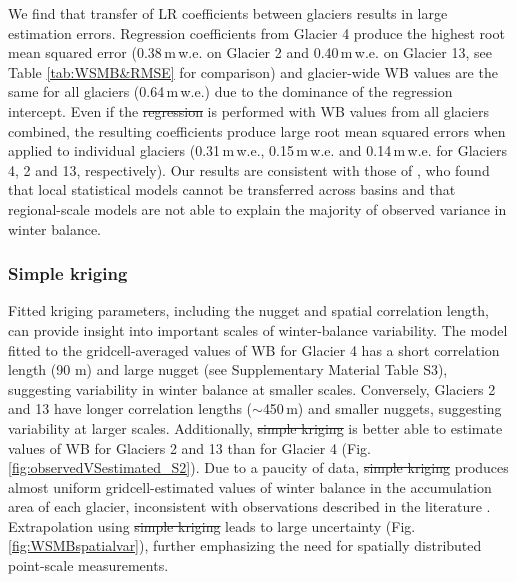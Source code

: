 \documentclass[review,oneside, letterpaper]{igs} %
\providecommand{\DIFadd}[1]{{\protect\color{blue}\uwave{#1}}} %
\providecommand{\DIFdel}[1]{{\protect\color{red}\sout{#1}}}                      %
\providecommand{\DIFaddbegin}{} %
\providecommand{\DIFaddend}{} %
\providecommand{\DIFdelbegin}{} %
\providecommand{\DIFdelend}{} %
\newcommand{\DIFscaledelfig}{0.5}
\newlength{\DIFdelgraphicswidth} %
\newlength{\DIFdelgraphicsheight} %
\newcommand{\DIFaddincludegraphics}[2][]{{\color{blue}\fbox{\DIFOincludegraphics[#1]{#2}}}} %
\newcommand{\DIFdelincludegraphics}[2][]{%
\sbox{\DIFdelgraphicsbox}{\DIFOincludegraphics[#1]{#2}}%
\settoboxwidth{\DIFdelgraphicswidth}{\DIFdelgraphicsbox} %
\settoboxtotalheight{\DIFdelgraphicsheight}{\DIFdelgraphicsbox} %
\scalebox{\DIFscaledelfig}{%
\parbox[b]{\DIFdelgraphicswidth}{\usebox{\DIFdelgraphicsbox}\\[-\baselineskip] \rule{\DIFdelgraphicswidth}{0em}}\llap{\resizebox{\DIFdelgraphicswidth}{\DIFdelgraphicsheight}{%
\setlength{\unitlength}{\DIFdelgraphicswidth}%
\begin{picture}(1,1)%
\thicklines\linethickness{2pt} %
{\color[rgb]{1,0,0}\put(0,0){\framebox(1,1){}}}%
{\color[rgb]{1,0,0}\put(0,0){\line( 1,1){1}}}%
{\color[rgb]{1,0,0}\put(0,1){\line(1,-1){1}}}%
\end{picture}%
}\hspace*{3pt}}} %
} %
\DeclareRobustCommand{\DIFaddbegin}{\DIFOaddbegin \let\includegraphics\DIFaddincludegraphics} %
\DeclareRobustCommand{\DIFaddend}{\DIFOaddend \let\includegraphics\DIFOincludegraphics} %
\DeclareRobustCommand{\DIFdelbegin}{\DIFOdelbegin \let\includegraphics\DIFdelincludegraphics} %
\DeclareRobustCommand{\DIFdelend}{\DIFOaddend \let\includegraphics\DIFOincludegraphics} %
\begin{document}
We find that transfer of LR coefficients between glaciers results in large estimation errors. Regression coefficients from Glacier 4 produce the highest root mean squared error (0.38\,m\,w.e. on Glacier 2 and 0.40\,m\,w.e. on Glacier 13, see Table \ref{tab:WSMB&RMSE} for comparison) and glacier-wide WB values are the same for all glaciers (0.64\,m\,w.e.) due to the dominance of the regression intercept. Even if the \DIFdelbegin \DIFdel{regression }\DIFdelend \DIFaddbegin \DIFadd{LR }\DIFaddend is performed with WB values from all glaciers combined, the resulting coefficients produce large root mean squared errors when applied to  individual glaciers (0.31\,m\,w.e., 0.15\,m\,w.e. and 0.14\,m\,w.e. for Glaciers 4, 2 and 13, respectively). Our results are consistent with those of \cite{Grunewald2013}, who found that local statistical models cannot be transferred across basins and that regional-scale models are not able to explain the majority of observed variance in winter balance. 

\subsubsection{Simple kriging}

Fitted kriging parameters, including the nugget and spatial correlation length, can provide insight into important scales of winter-balance variability. The model fitted to the gridcell-averaged values of WB for Glacier 4 has a short correlation length (90 m) and large nugget (see Supplementary Material Table S3), suggesting variability in winter balance at smaller scales. Conversely, Glaciers 2 and 13 have longer correlation lengths ($\sim$450\,m) and smaller nuggets, suggesting variability at larger scales. 
Additionally, \DIFdelbegin \DIFdel{simple kriging }\DIFdelend \DIFaddbegin \DIFadd{SK }\DIFaddend is better able to estimate values of WB for Glaciers 2 and 13 than for Glacier 4 (Fig. \ref{fig:observedVSestimated_S2}). Due to a paucity of data, \DIFdelbegin \DIFdel{simple kriging }\DIFdelend \DIFaddbegin \DIFadd{SK }\DIFaddend produces almost uniform gridcell-estimated values of winter balance in the accumulation area of each glacier,  inconsistent with observations described in the literature \citep[e.g.][]{Machguth2006, Grabiec2011}. Extrapolation using \DIFdelbegin \DIFdel{simple kriging }\DIFdelend \DIFaddbegin \DIFadd{SK }\DIFaddend leads to large uncertainty (Fig. \ref{fig:WSMBspatialvar}), further emphasizing the need for spatially distributed point-scale measurements. 
\end{document}
